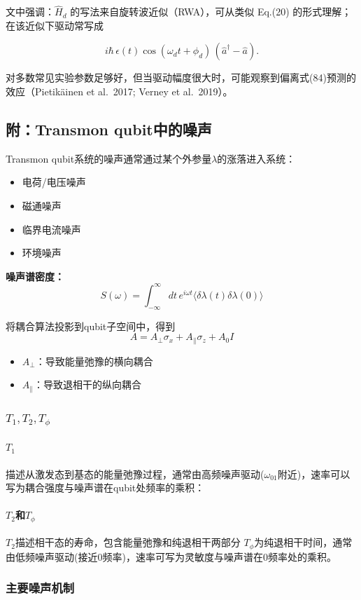 \documentclass[12pt,a4paper,oneside]{ctexbook}
\let\oldparagraph\paragraph
\renewcommand{\paragraph}[1]{\oldparagraph{#1}\mbox{}}
\begin{document}
文中强调：$\hat H_d$ 的写法来自旋转波近似（RWA），可从类似 Eq.(20) 的形式理解；在该近似下驱动常写成

\begin{equation}
i\hbar\,\epsilon(t)\cos(\omega_d t+\phi_d)\,(\hat a^\dagger-\hat a).
\end{equation}

对多数常见实验参数足够好，但当驱动幅度很大时，可能观察到偏离式(84)预测的效应（Pietik\"ainen et al.\ 2017; Verney et al.\ 2019）。

\subsection{附：Transmon qubit中的噪声}
Transmon qubit系统的噪声通常通过某个外参量$\lambda$的涨落进入系统：
\begin{itemize}
  \item 电荷/电压噪声
  \item 磁通噪声
  \item 临界电流噪声
  \item 环境噪声
\end{itemize}
\textbf{噪声谱密度：}
$$S(\omega) = \int_{-\infty}^{\infty} dt \, e^{i\omega t} \langle \delta\lambda(t) \delta\lambda(0) \rangle$$

将耦合算法投影到qubit子空间中，得到$$A = A_{\perp}\sigma_x + A_{\parallel}\sigma_z + A_0 I$$
\begin{itemize}
  \item $A_{\perp}$：导致能量弛豫的横向耦合
  \item $A_{\parallel}$：导致退相干的纵向耦合
\end{itemize}
\subsubsection{$T_1,T_2,T_\phi$}
\paragraph{$T_1$}
描述从激发态到基态的能量弛豫过程，通常由高频噪声驱动($\omega_{01}$附近)，速率可以写为耦合强度与噪声谱在qubit处频率的乘积：
\paragraph{$T_2$和$T_{\phi}$}
$T_2$描述相干态的寿命，包含能量弛豫和纯退相干两部分
$T_{\phi}$为纯退相干时间，通常由低频噪声驱动(接近0频率)，速率可写为灵敏度与噪声谱在0频率处的乘积。

\subsubsection{主要噪声机制}
\end{document}
